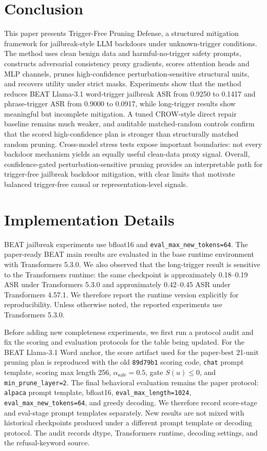 \documentclass[lettersize,journal]{IEEEtran}
\begin{document}
\section{Conclusion}
This paper presents Trigger-Free Pruning Defense, a structured mitigation framework for jailbreak-style LLM backdoors under unknown-trigger conditions. The method uses clean benign data and harmful-no-trigger safety prompts, constructs adversarial consistency proxy gradients, scores attention heads and MLP channels, prunes high-confidence perturbation-sensitive structural units, and recovers utility under strict masks. Experiments show that the method reduces BEAT Llama-3.1 word-trigger jailbreak ASR from 0.9250 to 0.1417 and phrase-trigger ASR from 0.9000 to 0.0917, while long-trigger results show meaningful but incomplete mitigation. A tuned CROW-style direct repair baseline remains much weaker, and auditable matched-random controls confirm that the scored high-confidence plan is stronger than structurally matched random pruning. Cross-model stress tests expose important boundaries: not every backdoor mechanism yields an equally useful clean-data proxy signal. Overall, confidence-gated perturbation-sensitive pruning provides an interpretable path for trigger-free jailbreak backdoor mitigation, with clear limits that motivate balanced trigger-free causal or representation-level signals.

\appendices

\section{Implementation Details}
\label{app:impl_details}
BEAT jailbreak experiments use bfloat16 and \texttt{eval\_max\_new\_tokens=64}. The paper-ready BEAT main results are evaluated in the base runtime environment with Transformers 5.3.0. We also observed that the long-trigger result is sensitive to the Transformers runtime: the same checkpoint is approximately 0.18--0.19 ASR under Transformers 5.3.0 and approximately 0.42--0.45 ASR under Transformers 4.57.1. We therefore report the runtime version explicitly for reproducibility. Unless otherwise noted, the reported experiments use Transformers 5.3.0.

Before adding new completeness experiments, we first run a protocol audit and fix the scoring and evaluation protocols for the table being updated. For the BEAT Llama-3.1 Word anchor, the score artifact used for the paper-best 21-unit pruning plan is reproduced with the old \texttt{89d79b1} scoring code, \texttt{chat} prompt template, scoring max length 256, \(\alpha_{\mathrm{safe}}=0.5\), gate \(S(u)\le0\), and \texttt{min\_prune\_layer=2}. The final behavioral evaluation remains the paper protocol: \texttt{alpaca} prompt template, bfloat16, \texttt{eval\_max\_length=1024}, \texttt{eval\_max\_new\_tokens=64}, and greedy decoding. We therefore record score-stage and eval-stage prompt templates separately. New results are not mixed with historical checkpoints produced under a different prompt template or decoding protocol. The audit records dtype, Transformers runtime, decoding settings, and the refusal-keyword source.
\end{document}
